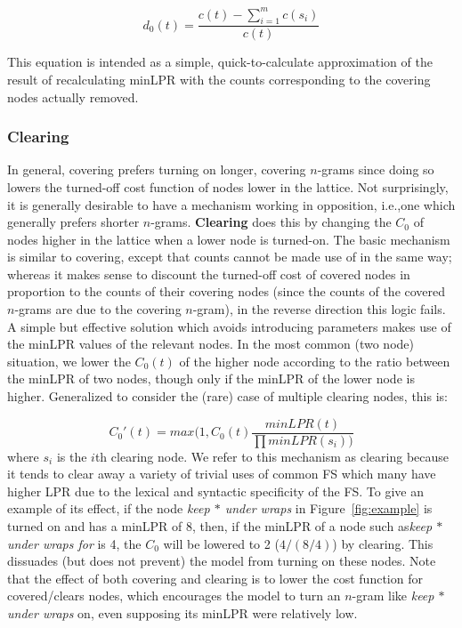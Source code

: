 \documentclass[11pt]{article}
\makeatletter
\def \ie {i.e.,\@ }
\newcommand{\gap}{$*$\xspace}
\newcommand{\ex}[1]{\textit{#1}\xspace}
\newcommand{\termdef}[1]{\textbf{#1}\xspace}
\newcommand{\figref}[2][]{Figure#1~\ref{#2}\xspace}
\makeatother
\begin{document}
\begin{displaymath}
d_{0}(t) = \frac{c(t) - \sum_{i=1}^{m}{c(s_i)}}{c(t)}
\end{displaymath}

\noindent
This equation is intended as a simple, quick-to-calculate approximation of the result of recalculating minLPR with the counts corresponding to the covering nodes actually removed.

\subsubsection{Clearing}

In general, covering prefers turning on longer, covering $n$-grams since doing so lowers the turned-off cost function of nodes lower in the lattice. Not surprisingly, it is generally desirable to have a mechanism working in opposition, \ie one which generally prefers shorter $n$-grams. \termdef{Clearing} does this by changing the $C_0$ of nodes higher in the lattice when a lower node is turned-on. The basic mechanism is similar to covering, except that counts cannot be made use of in the same way; whereas it makes sense to discount the turned-off cost of covered nodes in proportion to the counts of their covering nodes (since the counts of the covered $n$-grams are due to the covering $n$-gram), in the reverse direction this logic fails. A simple but effective solution which avoids introducing parameters makes use of the minLPR values of the relevant nodes. In the most common (two node) situation, we lower the  $C_{0}(t)$ of the higher node according to the ratio between the minLPR of two nodes, though only if the minLPR of the lower node is higher. Generalized to consider the (rare) case of multiple clearing nodes, this is:


\begin{displaymath}
C_{0}'(t) = max(1, C_{0}(t) \frac{minLPR(t)}{\prod{minLPR(s_i)})}
\end{displaymath}
where $s_i$ is the $i$th clearing node. We refer to this mechanism as clearing because it tends to clear away a variety of trivial uses of common FS which many have higher LPR due to the lexical and syntactic specificity of the FS. To give an example of its effect, if the node \ex{keep \gap under wraps} in \figref{fig:example} is turned on and has a minLPR of 8, then, if the minLPR of a node such as\ex{keep \gap under wraps for} is 4, the $C_{0}$ will be lowered to 2 ($4/(8/4)$) by clearing. This dissuades (but does not prevent) the model from turning on these nodes. Note that the effect of both covering and clearing is to lower the cost function for covered/clears nodes, which encourages the model to turn an $n$-gram like \ex{keep \gap under wraps} on, even supposing its minLPR were relatively low.
\end{document}
